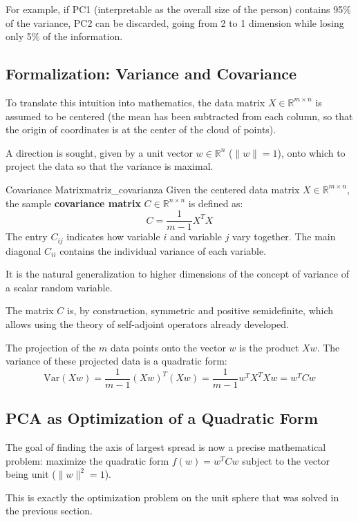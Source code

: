 \documentclass[11pt, a4paper]{article}
\begin{document}
For example, if PC1 (interpretable as the overall size of the person) contains 95\% of the variance, PC2 can be discarded, going from 2 to 1 dimension while losing only 5\% of the information.

\subsection{Formalization: Variance and Covariance}

To translate this intuition into mathematics, the data matrix $X \in \mathbb{R}^{m \times n}$ is assumed to be centered (the mean has been subtracted from each column, so that the origin of coordinates is at the center of the cloud of points).

A direction is sought, given by a unit vector $w \in \mathbb{R}^n$ ($\|w\| = 1$), onto which to project the data so that the variance is maximal.

\begin{definicion}{Covariance Matrix}{matriz_covarianza}
Given the centered data matrix $X \in \mathbb{R}^{m \times n}$, the sample \textbf{covariance matrix} $C \in \mathbb{R}^{n \times n}$ is defined as:
\[ C = \frac{1}{m-1} X^T X \]
The entry $C_{ij}$ indicates how variable $i$ and variable $j$ vary together. The main diagonal $C_{ii}$ contains the individual variance of each variable.
\end{definicion}

\obs It is the natural generalization to higher dimensions of the concept of variance of a scalar random variable.

\obs The matrix $C$ is, by construction, symmetric and positive semidefinite, which allows using the theory of self-adjoint operators already developed.

The projection of the $m$ data points onto the vector $w$ is the product $Xw$. The variance of these projected data is a quadratic form:
\[ \text{Var}(Xw) = \frac{1}{m-1} (Xw)^T (Xw) = \frac{1}{m-1} w^T X^T X w = w^T C w \]

\subsection{PCA as Optimization of a Quadratic Form}

The goal of finding the axis of largest spread is now a precise mathematical problem: maximize the quadratic form $f(w) = w^T C w$ subject to the vector being unit ($\|w\|^2 = 1$).

This is exactly the optimization problem on the unit sphere that was solved in the previous section.
\end{document}
